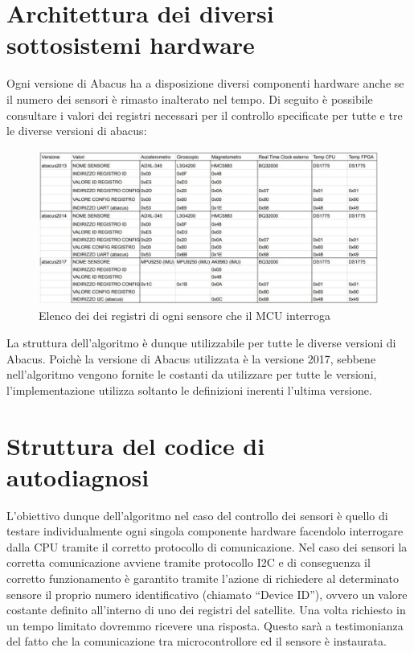 \documentclass[LaM,binding=0.6cm]{../sapthesis}
\begin{document}
\section{Architettura dei diversi sottosistemi hardware}



Ogni versione di Abacus ha a disposizione diversi componenti hardware anche se il numero dei sensori è rimasto inalterato nel tempo.
Di seguito è possibile consultare i valori dei registri necessari per il controllo specificate per tutte e tre le diverse versioni di abacus:

\begin{figure}[htbp]
\centerline{\includegraphics[scale=0.55]{examples/registerMapSensori.PNG}}
\caption{Elenco dei dei registri di ogni sensore che il MCU interroga}
\label{fig}
\end{figure}
\vspace{0.5cm}

La struttura dell'algoritmo è dunque utilizzabile per tutte le diverse versioni di Abacus.
Poichè la versione di Abacus utilizzata è la versione 2017, sebbene nell'algoritmo vengono fornite le costanti da utilizzare per tutte le versioni, l'implementazione utilizza soltanto le definizioni inerenti l'ultima versione.


\section{Struttura del codice di autodiagnosi}

L’obiettivo dunque dell’algoritmo nel caso del controllo dei sensori è quello di testare individualmente ogni singola componente hardware facendolo interrogare dalla CPU tramite il corretto protocollo di comunicazione.
Nel caso dei sensori la corretta comunicazione avviene tramite protocollo I2C e di conseguenza il corretto funzionamento è garantito tramite l’azione di richiedere al determinato sensore il proprio numero identificativo (chiamato “Device ID”), ovvero un valore costante definito all’interno di uno dei registri del satellite. Una volta richiesto in un tempo limitato dovremmo ricevere una risposta. Questo sarà a testimonianza del fatto che la comunicazione tra microcontrollore ed il sensore è instaurata.
\end{document}
